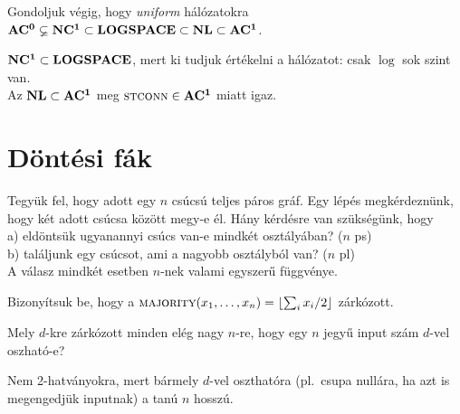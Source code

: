 \begin{Exercise}[counter={sorszam}, difficulty=0]
	Gondoljuk v\'egig, hogy \emph{uniform} h\'al\'ozatokra $\mbox{\ensuremath{\mathbf{AC^0}}}\varsubsetneq\mbox{\ensuremath{\mathbf{NC^1}}}\subset\mbox{\ensuremath{\mathbf{LOGSPACE}}}\subset\mbox{\ensuremath{\mathbf{NL}}}\subset\mbox{\ensuremath{\mathbf{AC^1}}}$.
\end{Exercise}
\begin{Answer}
	$\mbox{\ensuremath{\mathbf{NC^1}}}\subset\mbox{\ensuremath{\mathbf{LOGSPACE}}}$, mert ki tudjuk \'ert\'ekelni a h\'al\'ozatot: csak $\log$ sok szint van.\\
	Az $\mbox{\ensuremath{\mathbf{NL}}}\subset\mbox{\ensuremath{\mathbf{AC^1}}}$ meg $\la{STconn}\in \ACone$ miatt igaz.
\end{Answer}












\chapter{D\"ont\'esi f\'ak}

\begin{Exercise}[counter={sorszam}, difficulty=1]
	Tegy\"uk fel, hogy adott egy $n$ cs\'ucs\'u teljes p\'aros gr\'af. Egy l\'ep\'es megk\'erdezn\"unk, hogy k\'et adott cs\'ucsa k\"oz\"ott megy-e \'el. H\'any k\'erd\'esre van sz\"uks\'eg\"unk, hogy\\
	a) eld\"onts\"uk ugyanannyi cs\'ucs van-e mindk\'et oszt\'aly\'aban? ($n$ ps)\\
	b) tal\'aljunk egy cs\'ucsot, ami a nagyobb oszt\'alyb\'ol van? ($n$ pl)\\
	A v\'alasz mindk\'et esetben $n$-nek valami egyszer\H u f\"uggv\'enye.
\end{Exercise}	

\begin{Exercise}[counter={sorszam}, difficulty=0]
	Bizonyítsuk be, hogy a $\la{MAJORITY}(x_1,\dots,x_n) = \lfloor \sum_i{x_i} / 2 \rfloor$ zárkózott.
\end{Exercise}


\begin{Exercise}[counter={sorszam}, difficulty=0]
	Mely $d$-kre zárkózott minden el\'eg nagy $n$-re, hogy egy $n$ jegy\H u input sz\'am $d$-vel oszhat\'o-e?
\end{Exercise}
\begin{Answer}
	Nem 2-hatv\'anyokra, mert b\'armely $d$-vel oszthat\'ora (pl.\ csupa null\'ara, ha azt is megengedj\"uk inputnak) a tan\'u $n$ hossz\'u.
\end{Answer}

